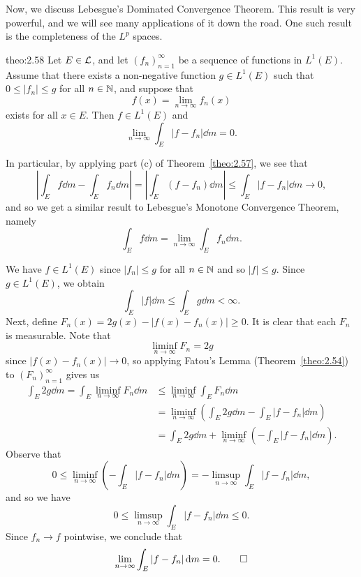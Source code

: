 Now, we discuss Lebesgue's Dominated Convergence Theorem. This result is 
very powerful, and we will see many applications of it down the road. 
One such result is the completeness of the $L^p$ spaces. 

\begin{theo}{theo:2.58}
    Let $E \in {\cal L}$, and let $(f_n)_{n=1}^\infty$ be a sequence of 
    functions in $L^1(E)$. Assume that there exists a non-negative 
    function $g \in L^1(E)$ such that $0 \leq |f_n| \leq g$ for all 
    $n \in \mathbb{N}$, and suppose that 
    \[ f(x) = \lim_{n\to\infty} f_n(x) \] 
    exists for all $x \in E$. Then $f \in L^1(E)$ and 
    \[ \lim_{n\to\infty} \int_E |f - f_n|\dd m = 0. \] 
\end{theo}

In particular, by applying part (c) of Theorem~\ref{theo:2.57}, we see that 
\[ \left| \int_E f\dd m - \int_E f_n\dd m \right| = \left| 
\int_E (f - f_n)\dd m \right| \leq \int_E |f - f_n|\dd m \to 0, \] 
and so we get a similar result to Lebesgue's Monotone Convergence Theorem, 
namely 
\[ \int_E f\dd m = \lim_{n\to\infty} \int_E f_n\dd m. \] 

\begin{pf}
    We have $f \in L^1(E)$ since $|f_n| \leq g$ for all $n \in \mathbb{N}$ 
    and so $|f| \leq g$. Since $g \in L^1(E)$, we obtain 
    \[ \int_E |f|\dd m \leq \int_E g\dd m < \infty. \] 
    Next, define $F_n(x) = 2g(x) - |f(x) - f_n(x)| \geq 0$. It is clear 
    that each $F_n$ is measurable. Note that 
    \[ \liminf_{n\to\infty} F_n = 2g \] 
    since $|f(x) - f_n(x)| \to 0$, so applying Fatou's Lemma 
    (Theorem~\ref{theo:2.54}) to $(F_n)_{n=1}^\infty$ gives us 
    \begin{align*}
        \int_E 2g \dd m = \int_E \liminf_{n\to\infty} F_n\dd m 
        &\leq \liminf_{n\to\infty} \int_E F_n\dd m \\ 
        &= \liminf_{n\to\infty} \left( \int_E 2g\dd m - 
        \int_E |f - f_n|\dd m \right) \\ 
        &= \int_E 2g\dd m + \liminf_{n\to\infty} \left( - 
        \int_E |f - f_n|\dd m \right). 
    \end{align*}
    Observe that 
    \[ 0 \leq \liminf_{n\to\infty} \left( -\int_E |f - f_n|\dd m \right) 
    = -\limsup_{n\to\infty} \int_E |f - f_n|\dd m, \] 
    and so we have 
    \[ 0 \leq \limsup_{n\to\infty} \int_E |f - f_n|\dd m \leq 0. \] 
    Since $f_n \to f$ pointwise, we conclude that 
    \[ \lim_{n\to\infty} \int_E |f - f_n|\,\mathrm{d} m = 0. \qedhere \] 
\end{pf}

